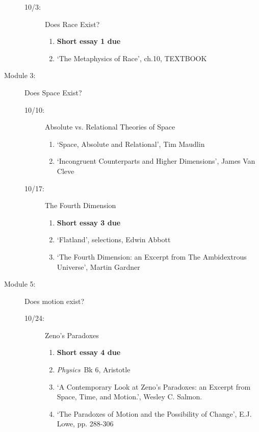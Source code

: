 \documentclass[article,oneside]{memoir}
\begin{document}
\begin{description}
\begin{description}
\item[10/3: ] Does Race Exist? 

\begin{enumerate}
\item \textbf{Short essay 1 due}

\item `The Metaphysics of Race', ch.10, TEXTBOOK

\end{enumerate}

\end{description}


\item[Module 3:] Does Space Exist? 
\begin{description}
\item[10/10:] Absolute vs. Relational Theories of Space
\begin{enumerate}
\item `Space, Absolute and Relational', Tim Maudlin
\item `Incongruent Counterparts and Higher Dimensions', James Van Cleve
\end{enumerate}

\item[10/17:] The Fourth Dimension
\begin{enumerate} 
\item \textbf{Short essay 3 due}
\item `Flatland', selections, Edwin Abbott 
\item `The Fourth Dimension: an Excerpt from The Ambidextrous Universe', Martin Gardner
\end{enumerate}
\end{description}

\item[Module 5:] Does motion exist? 
\begin{description}
\item [10/24:] Zeno's Paradoxes
\begin{enumerate}
\item \textbf{Short essay 4 due}
\item \emph{Physics}\ Bk 6, Aristotle
\item `A Contemporary Look at Zeno’s Paradoxes: an Excerpt from Space, Time, and Motion.', Wesley C. Salmon. 
\item `The Paradoxes of Motion and the Possibility of Change', E.J. Lowe, pp. 288-306
\end{enumerate}
\end{description}



\end{description}
\end{document}
